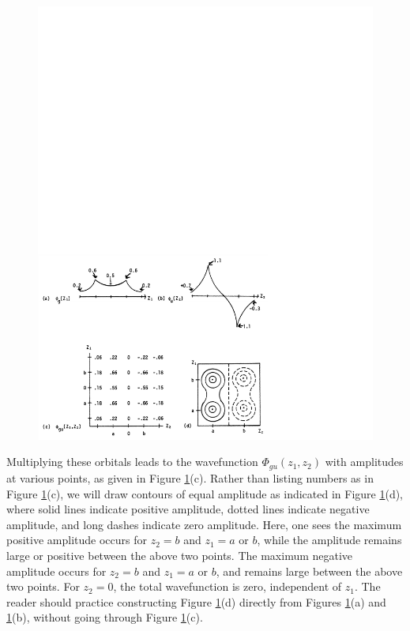 \begin{figure}
\includegraphics[scale=0.75]{fig2-20}
\caption{}
\label{fig2-20}
\end{figure}
    
Multiplying these orbitals leads to the wavefunction
$\Phi_{gu}(z_1,z_2)$ with amplitudes at various points, as given in
Figure \ref{fig2-20}(c). Rather than listing numbers as in Figure
\ref{fig2-20}(c), we will draw contours of equal amplitude as
indicated in Figure \ref{fig2-20}(d), where solid lines indicate
positive amplitude, dotted lines indicate negative amplitude, and long
dashes indicate zero amplitude. Here, one sees the maximum positive
amplitude occurs for $z_2 = b$ and $z_1 = a$ or $b$, while the
amplitude remains large or positive between the above two points. The
maximum negative amplitude occurs for $z_2 = b$ and $z_1 = a$ or $b$,
and remains large between the above two points. For $z_2 = 0$, the
total wavefunction is zero, independent of $z_1$. The reader should
practice constructing Figure \ref{fig2-20}(d) directly from Figures
\ref{fig2-20}(a) and \ref{fig2-20}(b), without going through Figure
\ref{fig2-20}(c).
    
